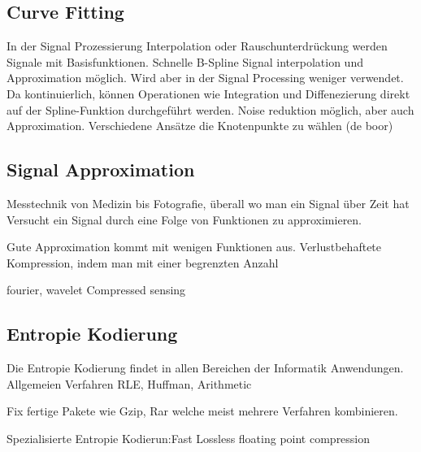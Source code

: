 \subsection{Curve Fitting}
In der Signal Prozessierung Interpolation oder Rauschunterdrückung werden Signale mit Basisfunktionen.  \cite{unser1993b:spline} Schnelle B-Spline Signal interpolation und Approximation möglich. Wird aber in der Signal Processing weniger verwendet. Da kontinuierlich, können Operationen wie Integration und Diffenezierung direkt auf der Spline-Funktion durchgeführt werden. Noise reduktion möglich, aber auch Approximation. Verschiedene Ansätze die Knotenpunkte zu wählen (de boor)

\subsection{Signal Approximation}
Messtechnik von Medizin bis Fotografie, überall wo man ein Signal über Zeit hat
Versucht ein Signal durch eine Folge von Funktionen zu approximieren.

Gute Approximation kommt mit wenigen Funktionen aus.
Verlustbehaftete Kompression, indem man mit einer begrenzten Anzahl

fourier, wavelet Compressed sensing

\subsection{Entropie Kodierung}
Die Entropie Kodierung findet in allen Bereichen der Informatik Anwendungen. Allgemeien Verfahren RLE, Huffman, Arithmetic

Fix fertige Pakete wie Gzip, Rar welche meist mehrere Verfahren kombinieren.

Spezialisierte Entropie Kodierun:Fast Lossless floating point compression \cite{ratanaworabhan2006fast}